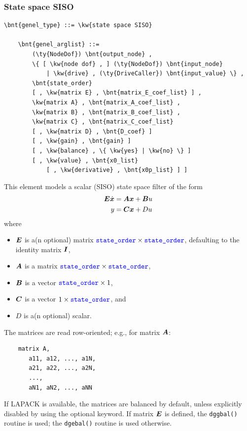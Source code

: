 \subsubsection{State space SISO}
\label{sec:EL:GENEL:STATE-SPACE-SISO}
\begin{Verbatim}[commandchars=\\\{\}]
    \bnt{genel_type} ::= \kw{state space SISO}

    \bnt{genel_arglist} ::=
        (\ty{NodeDof}) \bnt{output_node} ,
        \{ [ \kw{node dof} , ] (\ty{NodeDof}) \bnt{input_node}
            | \kw{drive} , (\ty{DriveCaller}) \bnt{input_value} \} ,
        \bnt{state_order}
        [ , \kw{matrix E} , \bnt{matrix_E_coef_list} ] ,
        \kw{matrix A} , \bnt{matrix_A_coef_list} ,
        \kw{matrix B} , \bnt{matrix_B_coef_list} ,
        \kw{matrix C} , \bnt{matrix_C_coef_list}
        [ , \kw{matrix D} , \bnt{D_coef} ]
        [ , \kw{gain} , \bnt{gain} ]
        [ , \kw{balance} , \{ \kw{yes} | \kw{no} \} ]
        [ , \kw{value} , \bnt{x0_list}
            [ , \kw{derivative} , \bnt{x0p_list} ] ]
\end{Verbatim}
This element models a scalar (SISO) state space filter of the form
\begin{align*}
	\boldsymbol{E} \dot{\boldsymbol{x}} &= \boldsymbol{A} \boldsymbol{x} + \boldsymbol{B} u \\
	y &= \boldsymbol{C} \boldsymbol{x} + D u
\end{align*}
where
\begin{itemize}
\item $\boldsymbol{E}$ is a(n optional) matrix
	$\textcolor{blue}{\texttt{state\_order}} \times \textcolor{blue}{\texttt{state\_order}}$, defaulting to the identity matrix $\boldsymbol{I}$,
\item $\boldsymbol{A}$ is a matrix
	$\textcolor{blue}{\texttt{state\_order}} \times \textcolor{blue}{\texttt{state\_order}}$,
\item $\boldsymbol{B}$ is a vector
	$\textcolor{blue}{\texttt{state\_order}} \times 1$,
\item $\boldsymbol{C}$ is a vector
	$1 \times \textcolor{blue}{\texttt{state\_order}}$, and
\item $D$ is a(n optional) scalar.
\end{itemize}
The matrices are read row-oriented; e.g., for matrix $\boldsymbol{A}$:
\begin{verbatim}
    matrix A,
       a11, a12, ..., a1N,
       a21, a22, ..., a2N,
       ...,
       aN1, aN2, ..., aNN
\end{verbatim}

If LAPACK is available, the matrices are balanced by default,
unless explicitly disabled by using the  optional keyword.
If matrix $\boldsymbol{E}$ is defined, the \texttt{dggbal()} routine is used;
the \texttt{dgebal()} routine is used otherwise.

